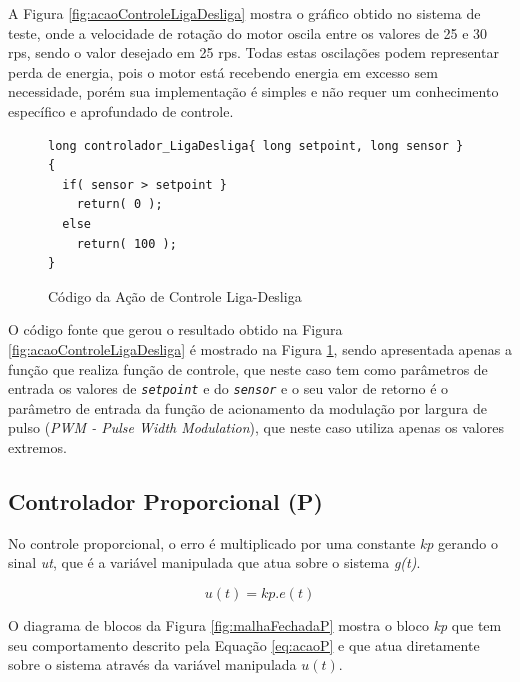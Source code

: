 A Figura \ref{fig:acaoControleLigaDesliga} mostra o gráfico obtido no sistema de teste, onde a velocidade de rotação do motor oscila entre os valores de 25 e 30 rps, sendo o valor desejado em 25 rps. 
Todas estas oscilações podem representar perda de energia, pois o motor está recebendo energia em excesso sem necessidade, porém sua implementação é simples e não requer um conhecimento específico e aprofundado de controle.



\begin{figure}[!htb]
\centering
\begin{minipage}{0.8\linewidth}
\begin{lstlisting}
long controlador_LigaDesliga{ long setpoint, long sensor }
{
  if( sensor > setpoint }
    return( 0 );
  else
    return( 100 );
}
\end{lstlisting}
\end{minipage}
\caption{Código da Ação de Controle Liga-Desliga}
\label{fig:codigoAcaoLigaDesliga}
\end{figure}

O código fonte que gerou o resultado obtido na Figura \ref{fig:acaoControleLigaDesliga} é  mostrado na Figura \ref{fig:codigoAcaoLigaDesliga}, sendo apresentada apenas a função que realiza função de controle, que neste caso tem como parâmetros de entrada os valores de \textit{\texttt{setpoint}} e do \textit{\texttt{sensor}} e o seu valor de retorno é o parâmetro de entrada da função de acionamento da modulação por largura de pulso (\textit{PWM - Pulse Width Modulation}), que neste caso utiliza apenas os valores extremos.



\subsection{ Controlador Proporcional (P) } 

 No controle proporcional, o erro é multiplicado por uma constante \emph{kp} gerando o sinal \emph{u{t}}, que é a variável manipulada que atua sobre o sistema \emph{g(t)}.

\begin{equation}
 u(t) = kp . e(t)
\label{eq:acaoP}
\end{equation}


O diagrama de blocos da Figura \ref{fig:malhaFechadaP} mostra o bloco \emph{kp} que tem seu comportamento descrito pela Equação \ref{eq:acaoP} e que atua diretamente sobre o sistema através da variável manipulada $u(t)$.

